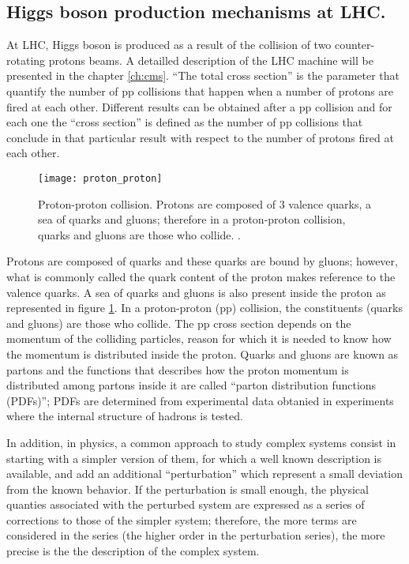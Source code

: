 \subsection{Higgs boson production mechanisms at LHC.}

\noindent At LHC, Higgs boson is produced as a result of the collision of two counter-rotating protons beams. A detailled description of the LHC machine will be presented in the chapter \ref{ch:cms}. ``The total cross section'' is the parameter that quantify the number of pp collisions that happen when a number of protons are fired at each other. Different results can be obtained after a pp collision and for each one the ``cross section'' is defined as the number of pp collisions that conclude in that particular result with respect to the number of protons fired at each other.
\begin{figure}[!h]
\centering
\texttt{[image: proton\_proton]}
\caption[Proton-Proton collision]{Proton-proton collision. Protons are composed of 3 valence quarks, a sea of quarks and gluons; therefore in a proton-proton collision, quarks and gluons are those who collide. \cite{pp_coll}.}
\label{pp_collision}
\end{figure}

\noindent Protons are composed of quarks and these quarks are bound by gluons; however, what is commonly called the quark content of the proton makes reference to the valence quarks. A sea of quarks and gluons is also present inside the proton as represented in figure \ref{pp_collision}. In a proton-proton (pp) collision, the constituents (quarks and gluons) are those who collide. The pp cross section depends on the momentum of the colliding particles, reason for which it is needed to know how the momentum is distributed inside the proton. Quarks and gluons are known as partons and the functions that describes how the proton momentum is distributed among partons inside it are called ``parton distribution functions (PDFs)''; PDFs are determined from experimental data obtanied in experiments where the internal structure of hadrons is tested.

\noindent In addition, in physics, a common approach to study complex systems consist in starting with a simpler version of them, for which a well known description is available, and add an additional ``perturbation'' which represent a small deviation from the known behavior. If the perturbation is small enough, the physical quanties associated with the perturbed system are expressed as a series of corrections to those of the simpler system; therefore, the more terms are considered in the series (the higher order in the perturbation series), the more precise is the the description of the complex system.

